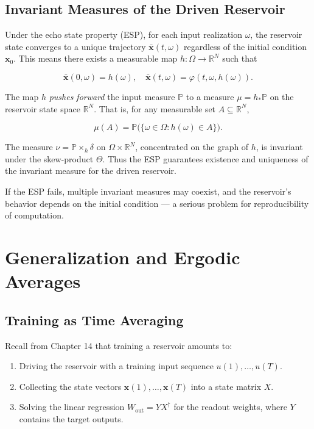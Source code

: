 \subsection{Invariant Measures of the Driven Reservoir}\label{sec:16.1.3}

Under the echo state property (ESP), for each input realization $\omega$, the reservoir state converges to a unique trajectory $\bar{\mathbf{x}}(t, \omega)$ regardless of the initial condition $\mathbf{x}_0$. This means there exists a measurable map $h: \Omega \to \mathbb{R}^N$ such that

\[
\bar{\mathbf{x}}(0, \omega) = h(\omega), \quad \bar{\mathbf{x}}(t, \omega) = \varphi(t, \omega, h(\omega)).
\]

The map $h$ \textit{pushes forward} the input measure $\mathbb{P}$ to a measure $\mu = h_* \mathbb{P}$ on the reservoir state space $\mathbb{R}^N$. That is, for any measurable set $A \subseteq \mathbb{R}^N$,

\[
\mu(A) = \mathbb{P}\bigl(\{\omega \in \Omega : h(\omega) \in A\}\bigr).
\]

The measure $\nu = \mathbb{P} \times_h \delta$ on $\Omega \times \mathbb{R}^N$, concentrated on the graph of $h$, is invariant under the skew-product $\Theta$. Thus the ESP guarantees existence and uniqueness of the invariant measure for the driven reservoir.

\begin{remark}
If the ESP fails, multiple invariant measures may coexist, and the reservoir's behavior depends on the initial condition --- a serious problem for reproducibility of computation.


\bigskip

\end{remark}


\section{Generalization and Ergodic Averages}\label{sec:16.2}

\subsection{Training as Time Averaging}\label{sec:16.2.1}

Recall from Chapter 14 that training a reservoir amounts to:
\begin{enumerate}[nosep]
  \item Driving the reservoir with a training input sequence $u(1), \ldots, u(T)$.
  \item Collecting the state vectors $\mathbf{x}(1), \ldots, \mathbf{x}(T)$ into a state matrix $X$.
  \item Solving the linear regression $W_{\text{out}} = Y X^\dagger$ for the readout weights, where $Y$ contains the target outputs.
\end{enumerate}

